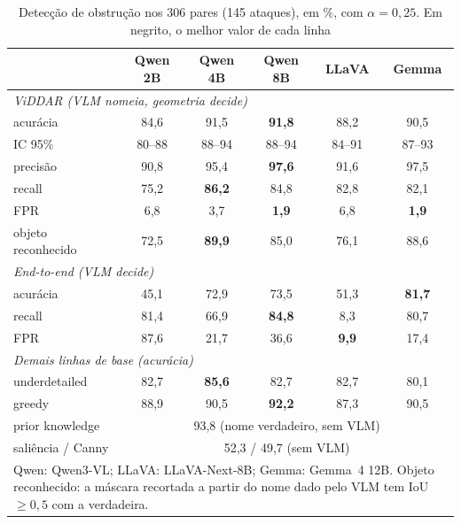 \documentclass[conference]{IEEEtran}
\begin{document}
\begin{table}[!t]
\renewcommand{\arraystretch}{1.05}
\caption{Detecção de obstrução nos 306 pares (145 ataques), em \%, com $\alpha=0{,}25$. Em negrito, o
melhor valor de cada linha}
\label{tab:obs}
\centering
\footnotesize
\setlength{\tabcolsep}{3.5pt}
\begin{tabular}{lccccc}
\toprule
 & Qwen 2B & Qwen 4B & Qwen 8B & LLaVA & Gemma \\
\midrule
\multicolumn{6}{l}{\textit{ViDDAR (VLM nomeia, geometria decide)}} \\
\quad acurácia & 84,6 & 91,5 & \textbf{91,8} & 88,2 & 90,5 \\
\quad \scriptsize IC 95\% & \scriptsize 80--88 & \scriptsize 88--94 & \scriptsize 88--94 & \scriptsize 84--91 & \scriptsize 87--93 \\
\quad precisão & 90,8 & 95,4 & \textbf{97,6} & 91,6 & 97,5 \\
\quad recall & 75,2 & \textbf{86,2} & 84,8 & 82,8 & 82,1 \\
\quad FPR & 6,8 & 3,7 & \textbf{1,9} & 6,8 & \textbf{1,9} \\
\quad objeto reconhecido & 72,5 & \textbf{89,9} & 85,0 & 76,1 & 88,6 \\
\midrule
\multicolumn{6}{l}{\textit{End-to-end (VLM decide)}} \\
\quad acurácia & 45,1 & 72,9 & 73,5 & 51,3 & \textbf{81,7} \\
\quad recall & 81,4 & 66,9 & \textbf{84,8} & 8,3 & 80,7 \\
\quad FPR & 87,6 & 21,7 & 36,6 & \textbf{9,9} & 17,4 \\
\midrule
\multicolumn{6}{l}{\textit{Demais linhas de base (acurácia)}} \\
\quad underdetailed & 82,7 & \textbf{85,6} & 82,7 & 82,7 & 80,1 \\
\quad greedy & 88,9 & 90,5 & \textbf{92,2} & 87,3 & 90,5 \\
\quad prior knowledge & \multicolumn{5}{c}{93,8 (nome verdadeiro, sem VLM)} \\
\quad saliência / Canny & \multicolumn{5}{c}{52,3 / 49,7 (sem VLM)} \\
\bottomrule
\multicolumn{6}{L{8.2cm}}{\scriptsize Qwen: Qwen3-VL; LLaVA: LLaVA-Next-8B; Gemma: Gemma~4 12B.
Objeto reconhecido: a máscara recortada a partir do nome dado pelo VLM tem IoU $\geq 0{,}5$ com a
verdadeira.}
\end{tabular}
\end{table}
\end{document}
